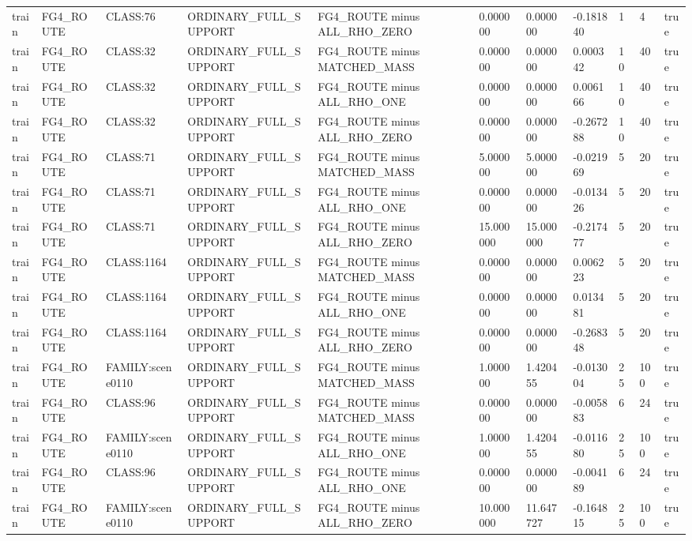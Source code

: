 \begin{tabular}{lllllllllll}
train & FG4\_ROUTE & CLASS:76 & ORDINARY\_FULL\_SUPPORT & FG4\_ROUTE minus ALL\_RHO\_ZERO & 0.000000 & 0.000000 & -0.181840 & 1 & 4 & true \\
train & FG4\_ROUTE & CLASS:32 & ORDINARY\_FULL\_SUPPORT & FG4\_ROUTE minus MATCHED\_MASS & 0.000000 & 0.000000 & 0.000342 & 10 & 40 & true \\
train & FG4\_ROUTE & CLASS:32 & ORDINARY\_FULL\_SUPPORT & FG4\_ROUTE minus ALL\_RHO\_ONE & 0.000000 & 0.000000 & 0.006166 & 10 & 40 & true \\
train & FG4\_ROUTE & CLASS:32 & ORDINARY\_FULL\_SUPPORT & FG4\_ROUTE minus ALL\_RHO\_ZERO & 0.000000 & 0.000000 & -0.267288 & 10 & 40 & true \\
train & FG4\_ROUTE & CLASS:71 & ORDINARY\_FULL\_SUPPORT & FG4\_ROUTE minus MATCHED\_MASS & 5.000000 & 5.000000 & -0.021969 & 5 & 20 & true \\
train & FG4\_ROUTE & CLASS:71 & ORDINARY\_FULL\_SUPPORT & FG4\_ROUTE minus ALL\_RHO\_ONE & 0.000000 & 0.000000 & -0.013426 & 5 & 20 & true \\
train & FG4\_ROUTE & CLASS:71 & ORDINARY\_FULL\_SUPPORT & FG4\_ROUTE minus ALL\_RHO\_ZERO & 15.000000 & 15.000000 & -0.217477 & 5 & 20 & true \\
train & FG4\_ROUTE & CLASS:1164 & ORDINARY\_FULL\_SUPPORT & FG4\_ROUTE minus MATCHED\_MASS & 0.000000 & 0.000000 & 0.006223 & 5 & 20 & true \\
train & FG4\_ROUTE & CLASS:1164 & ORDINARY\_FULL\_SUPPORT & FG4\_ROUTE minus ALL\_RHO\_ONE & 0.000000 & 0.000000 & 0.013481 & 5 & 20 & true \\
train & FG4\_ROUTE & CLASS:1164 & ORDINARY\_FULL\_SUPPORT & FG4\_ROUTE minus ALL\_RHO\_ZERO & 0.000000 & 0.000000 & -0.268348 & 5 & 20 & true \\
train & FG4\_ROUTE & FAMILY:scene0110 & ORDINARY\_FULL\_SUPPORT & FG4\_ROUTE minus MATCHED\_MASS & 1.000000 & 1.420455 & -0.013004 & 25 & 100 & true \\
train & FG4\_ROUTE & CLASS:96 & ORDINARY\_FULL\_SUPPORT & FG4\_ROUTE minus MATCHED\_MASS & 0.000000 & 0.000000 & -0.005883 & 6 & 24 & true \\
train & FG4\_ROUTE & FAMILY:scene0110 & ORDINARY\_FULL\_SUPPORT & FG4\_ROUTE minus ALL\_RHO\_ONE & 1.000000 & 1.420455 & -0.011680 & 25 & 100 & true \\
train & FG4\_ROUTE & CLASS:96 & ORDINARY\_FULL\_SUPPORT & FG4\_ROUTE minus ALL\_RHO\_ONE & 0.000000 & 0.000000 & -0.004189 & 6 & 24 & true \\
train & FG4\_ROUTE & FAMILY:scene0110 & ORDINARY\_FULL\_SUPPORT & FG4\_ROUTE minus ALL\_RHO\_ZERO & 10.000000 & 11.647727 & -0.164815 & 25 & 100 & true \\

\end{tabular}
